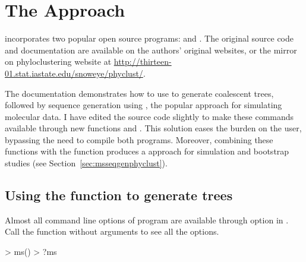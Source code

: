 \section[The ms+seqgen Approach]{The  Approach}
\label{sec:msseqgen}

 incorporates two popular open source  programs:
 \citep{Hudson2002} and  \citep{Rambaut1997}.
The original source code and documentation are available on the authors'
original websites, or the mirror on phyloclustering website at
\url{http://thirteen-01.stat.iastate.edu/snoweye/phyclust/}.

The  documentation demonstrates how to use 
to generate coalescent trees, followed by sequence generation using ,
the popular  approach for simulating molecular data.
I have edited the source code slightly to make these commands available through new  functions  and .
This solution eases the burden on the user, bypassing the need to compile both programs.
Moreover, combining these functions with the  function produces a
 approach 
 for simulation and bootstrap studies (see Section~\ref{sec:msseqgenphyclust}).




\subsection[Using the ms() function to generate trees]{Using the  function to generate trees}
\label{sec:ms}

Almost all command line options of program  are available
through option  in .
Call the function without arguments to see all the options.
\begin{Code}
> ms()
> ?ms
\end{Code}

